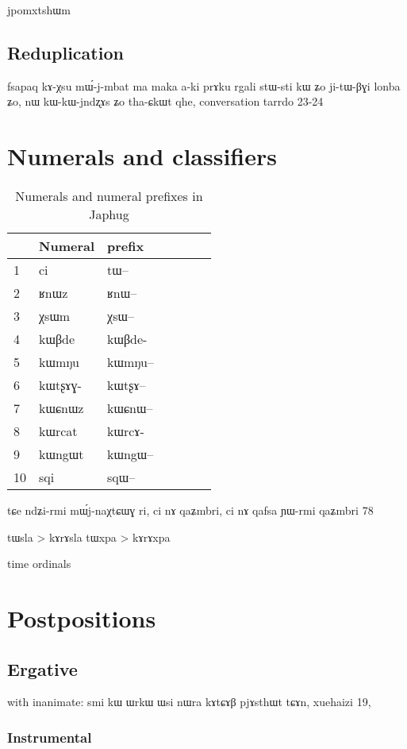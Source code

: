 \documentclass[oldfontcommands,oneside,a4paper,11pt]{memoir}
\newcommand{\ipa}[1]{{\phon #1}} %
\begin{document}
jpomxtshɯm

\section{Reduplication}
fsapaq	kɤ-χsu	mɯ́-j-mbat	ma	maka	a-ki	prɤku	rgali	stɯ-sti	kɯ	ʑo ji-tɯ-βɣi	lonba	ʑo,	nɯ	kɯ-kɯ-jndʐɤs	ʑo	tha-ɕkɯt	qhe,
conversation tarrdo 23-24


\chapter{Numerals and classifiers}


\begin{table}[H]
\caption{Numerals and numeral prefixes in Japhug} \centering
\begin{tabular}{lllllll}
\toprule
&Numeral & prefix \\
\midrule
1 &\ipa{ci} &\ipa{tɯ--} \\
2 &\ipa{ʁnɯz} &\ipa{ʁnɯ--} \\
3 &\ipa{χsɯm} &\ipa{χsɯ--} \\
4 &\ipa{kɯβde} &\ipa{kɯβde-} \\
5 &\ipa{kɯmŋu} &\ipa{kɯmŋu--} \\
6 &\ipa{kɯtʂɤɣ-} &\ipa{kɯtʂɤ--} \\
7 &\ipa{kɯɕnɯz} &\ipa{kɯɕnɯ--} \\
8 &\ipa{kɯrcat} &\ipa{kɯrcɤ-} \\
9 &\ipa{kɯngɯt} &\ipa{kɯngɯ--} \\
10 &\ipa{sqi} &\ipa{sqɯ--} \\
\bottomrule
\end{tabular}
\end{table}
tɕe ndʑi-rmi mɯ́j-naχtɕɯɣ ri, ci nɤ qaʑmbri, ci nɤ qafsa ɲɯ-rmi
qaʑmbri 78

tɯsla > kɤrɤsla
tɯxpa > kɤrɤxpa


time ordinals
\chapter{Postpositions} \label{chapt:postpositions}


\section{Ergative} \label{sec:erg}
with inanimate:
smi kɯ ɯrkɯ ɯsi nɯra kɤtɕɤβ pjɤsthɯt tɕɤn,
xuehaizi 19,

\subsection{Instrumental}
\end{document}
